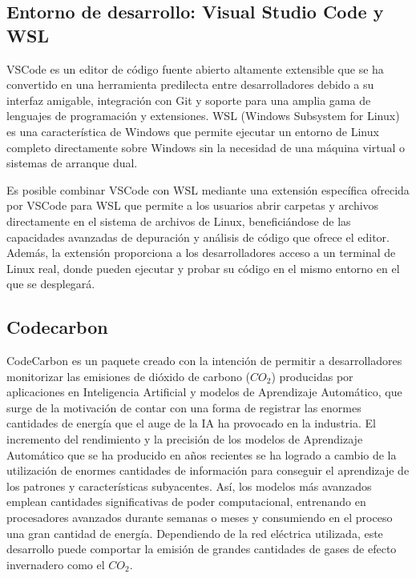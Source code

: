 \subsection{Entorno de desarrollo: Visual Studio Code y WSL}
\label{sec:dev-env}

VSCode es un editor de código fuente abierto altamente extensible que se ha convertido en una herramienta predilecta entre desarrolladores debido a su interfaz amigable, integración con Git y soporte para una amplia gama de lenguajes de programación y extensiones. WSL (Windows Subsystem for Linux) es una característica de Windows que permite ejecutar un entorno de Linux completo directamente sobre Windows sin la necesidad de una máquina virtual o sistemas de arranque dual.

Es posible combinar VSCode con WSL mediante una extensión específica ofrecida por VSCode para WSL que permite a los usuarios abrir carpetas y archivos directamente en el sistema de archivos de Linux, beneficiándose de las capacidades avanzadas de depuración y análisis de código que ofrece el editor. Además, la extensión proporciona a los desarrolladores acceso a un terminal de Linux real, donde pueden ejecutar y probar su código en el mismo entorno en el que se desplegará. 


\subsection{Codecarbon}

CodeCarbon \cite{codecarbon}\cite{codecarbon-software} es un paquete creado con la intención de permitir a desarrolladores monitorizar las emisiones de dióxido de carbono ($CO_{2}$) producidas por aplicaciones en Inteligencia Artificial y modelos de Aprendizaje Automático, que surge de la motivación de contar con una forma de registrar las enormes cantidades de energía que el auge de la IA ha provocado en la industria. El incremento del rendimiento y la precisión de los modelos de Aprendizaje Automático que se ha producido en años recientes se ha logrado a cambio de la utilización de enormes cantidades de información para conseguir el aprendizaje de los patrones y características subyacentes. Así, los modelos más avanzados emplean cantidades significativas de poder computacional, entrenando en procesadores avanzados durante semanas o meses y consumiendo en el proceso una gran cantidad de energía. Dependiendo de la red eléctrica utilizada, este desarrollo puede comportar la emisión de grandes cantidades de gases de efecto invernadero como el $CO_{2}$.


